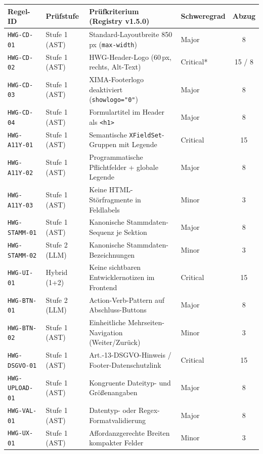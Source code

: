 \begin{table}[htbp]
\centering
\scriptsize
\renewcommand{\arraystretch}{1.0}
\begin{tabularx}{\textwidth}{ll>{\raggedright\arraybackslash}Xlc}
\toprule
\textbf{Regel-ID} & \textbf{Prüfstufe} & \textbf{Prüfkriterium (Registry v1.5.0)} & \textbf{Schweregrad} & \textbf{Abzug} \\
\midrule
\texttt{HWG-CD-01}     & Stufe 1 (AST) & Standard-Layoutbreite 850\,px (\texttt{max-width}) & Major & 8 \\
\texttt{HWG-CD-02}     & Stufe 1 (AST) & HWG-Header-Logo (60\,px, rechts, Alt-Text) & Critical* & 15 / 8 \\
\texttt{HWG-CD-03}     & Stufe 1 (AST) & XIMA-Footerlogo deaktiviert (\texttt{showlogo="0"}) & Major & 8 \\
\texttt{HWG-CD-04}     & Stufe 1 (AST) & Formulartitel im Header als \texttt{<h1>} & Major & 8 \\
\texttt{HWG-A11Y-01}   & Stufe 1 (AST) & Semantische \texttt{XFieldSet}-Gruppen mit Legende & Critical & 15 \\
\texttt{HWG-A11Y-02}   & Stufe 1 (AST) & Programmatische Pflichtfelder + globale Legende & Major & 8 \\
\texttt{HWG-A11Y-03}   & Stufe 1 (AST) & Keine HTML-Störfragmente in Feldlabels & Minor & 3 \\
\texttt{HWG-STAMM-01}  & Stufe 1 (AST) & Kanonische Stammdaten-Sequenz je Sektion & Major & 8 \\
\texttt{HWG-STAMM-02}  & Stufe 2 (LLM) & Kanonische Stammdaten-Bezeichnungen & Minor & 3 \\
\texttt{HWG-UI-01}     & Hybrid (1+2)  & Keine sichtbaren Entwicklernotizen im Frontend & Critical & 15 \\
\texttt{HWG-BTN-01}    & Stufe 2 (LLM) & Action-Verb-Pattern auf Abschluss-Buttons & Major & 8 \\
\texttt{HWG-BTN-02}    & Stufe 1 (AST) & Einheitliche Mehrseiten-Navigation (Weiter/Zurück) & Minor & 3 \\
\texttt{HWG-DSGVO-01}  & Stufe 1 (AST) & Art.-13-DSGVO-Hinweis / Footer-Datenschutzlink & Critical & 15 \\
\texttt{HWG-UPLOAD-01} & Stufe 1 (AST) & Kongruente Dateityp- und Größenangaben & Major & 8 \\
\texttt{HWG-VAL-01}    & Stufe 1 (AST) & Datentyp- oder Regex-Formatvalidierung & Major & 8 \\
\texttt{HWG-UX-01}     & Stufe 1 (AST) & Affordanzgerechte Breiten kompakter Felder & Minor & 3 \\

\end{tabularx}
\end{table}
